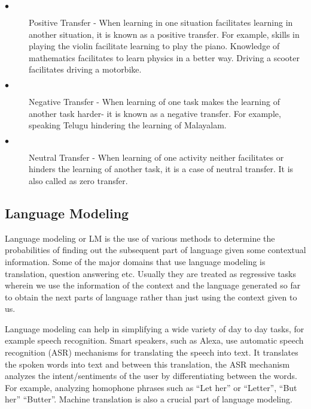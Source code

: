 \begin{description}
\item[$\bullet$] Positive Transfer - When learning in one situation facilitates learning in another situation, it is known as a positive transfer. For example, skills in playing the violin facilitate learning to play the piano. Knowledge of mathematics facilitates to learn physics in a better way. Driving a scooter facilitates driving a motorbike.

\item[$\bullet$] Negative Transfer - When learning of one task makes the learning of another task harder- it is known as a negative transfer. For example, speaking Telugu hindering the learning of Malayalam.

\item[$\bullet$] Neutral Transfer - When learning of one activity neither facilitates or hinders the learning of another task, it is a case of neutral transfer. It is also called as zero transfer.

\end{description}


\subsection{Language Modeling}
Language modeling or LM is the use of various methods to determine the probabilities of finding out the subsequent part of language given some contextual information. Some of the major domains that use language modeling is translation, question answering etc. Usually they are treated as regressive tasks wherein we use the information of the context and the language generated so far to obtain the next parts of language rather than just using the context given to us.

Language modeling can help in simplifying a wide variety of day to day tasks, for example speech recognition.  Smart speakers, such as Alexa, use automatic speech recognition (ASR) mechanisms for translating the speech into text. It translates the spoken words into text and between this translation, the ASR mechanism analyzes the intent/sentiments of the user by differentiating between the words. For example, analyzing homophone phrases such as “Let her” or “Letter”, “But her” “Butter”. Machine translation is also a crucial part of language modeling.\cite{langmodel}



